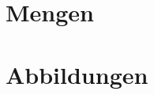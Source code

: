 \documentclass[a4paper,12pt, DIV12]{scrartcl}
\begin{document}
\tableofcontents
\newpage
\section{Mengen}

\newpage

\newpage
\section{Abbildungen}

\newpage

\newpage

\newpage

\end{document}
